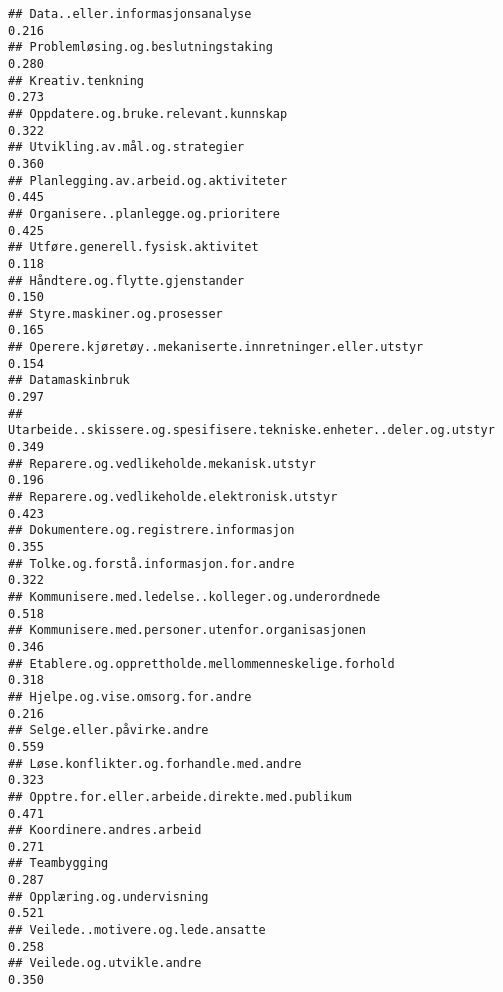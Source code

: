 \documentclass[
]{article}
\begin{document}
\begin{verbatim}
## Data..eller.informasjonsanalyse                                                  0.216
## Problemløsing.og.beslutningstaking                                               0.280
## Kreativ.tenkning                                                                 0.273
## Oppdatere.og.bruke.relevant.kunnskap                                             0.322
## Utvikling.av.mål.og.strategier                                                   0.360
## Planlegging.av.arbeid.og.aktiviteter                                             0.445
## Organisere..planlegge.og.prioritere                                              0.425
## Utføre.generell.fysisk.aktivitet                                                 0.118
## Håndtere.og.flytte.gjenstander                                                   0.150
## Styre.maskiner.og.prosesser                                                      0.165
## Operere.kjøretøy..mekaniserte.innretninger.eller.utstyr                          0.154
## Datamaskinbruk                                                                   0.297
## Utarbeide..skissere.og.spesifisere.tekniske.enheter..deler.og.utstyr             0.349
## Reparere.og.vedlikeholde.mekanisk.utstyr                                         0.196
## Reparere.og.vedlikeholde.elektronisk.utstyr                                      0.423
## Dokumentere.og.registrere.informasjon                                            0.355
## Tolke.og.forstå.informasjon.for.andre                                            0.322
## Kommunisere.med.ledelse..kolleger.og.underordnede                                0.518
## Kommunisere.med.personer.utenfor.organisasjonen                                  0.346
## Etablere.og.opprettholde.mellommenneskelige.forhold                              0.318
## Hjelpe.og.vise.omsorg.for.andre                                                  0.216
## Selge.eller.påvirke.andre                                                        0.559
## Løse.konflikter.og.forhandle.med.andre                                           0.323
## Opptre.for.eller.arbeide.direkte.med.publikum                                    0.471
## Koordinere.andres.arbeid                                                         0.271
## Teambygging                                                                      0.287
## Opplæring.og.undervisning                                                        0.521
## Veilede..motivere.og.lede.ansatte                                                0.258
## Veilede.og.utvikle.andre                                                         0.350

\end{verbatim}
\end{document}
